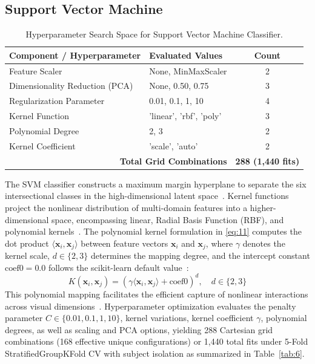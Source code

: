 \subsection{Support Vector Machine}
\label{sec:support_vector_machine_classifier}
\label{sec:support_vector_machine}

\begin{table}[htbp]
\caption{Hyperparameter Search Space for Support Vector Machine Classifier.}
\label{tab:6}
\label{tab:VI}
\label{tab:svm_params}
\centering
\footnotesize
\begin{tabular}{llc}
\toprule
Component / Hyperparameter & Evaluated Values & Count \\
\midrule
Feature Scaler & None, MinMaxScaler & 2 \\
Dimensionality Reduction (PCA) & None, 0.50, 0.75 & 3 \\
Regularization Parameter & 0.01, 0.1, 1, 10 & 4 \\
Kernel Function & 'linear', 'rbf', 'poly' & 3 \\
Polynomial Degree & 2, 3 & 2 \\
Kernel Coefficient & 'scale', 'auto' & 2 \\
\midrule
\multicolumn{2}{r}{\textbf{Total Grid Combinations}} & \textbf{288 (1,440 fits)} \\
\bottomrule
\end{tabular}
\end{table}

The SVM classifier constructs a maximum margin hyperplane to separate the six intersectional classes in the high-dimensional latent space~\cite{ref40}. Kernel functions project the nonlinear distribution of multi-domain features into a higher-dimensional space, encompassing linear, Radial Basis Function (RBF), and polynomial kernels~\cite{ref41}. The polynomial kernel formulation in \eqref{eq:11} computes the dot product $\langle \mathbf{x}_i, \mathbf{x}_j \rangle$ between feature vectors $\mathbf{x}_i$ and $\mathbf{x}_j$, where $\gamma$ denotes the kernel scale, $d \in \{2, 3\}$ determines the mapping degree, and the intercept constant $\text{coef0} = 0.0$ follows the scikit-learn default value~\cite{ref42}:
\begin{equation}
K(\mathbf{x}_i, \mathbf{x}_j) = (\gamma \langle \mathbf{x}_i, \mathbf{x}_j \rangle + \text{coef0})^d, \quad d \in \{2, 3\}
\label{eq:11}
\end{equation}
This polynomial mapping facilitates the efficient capture of nonlinear interactions across visual dimensions~\cite{ref43}. Hyperparameter optimization evaluates the penalty parameter $C \in \{0.01, 0.1, 1, 10\}$, kernel variations, kernel coefficient $\gamma$, polynomial degrees, as well as scaling and PCA options, yielding 288 Cartesian grid combinations (168 effective unique configurations) or 1,440 total fits under 5-Fold StratifiedGroupKFold CV with subject isolation as summarized in Table~\ref{tab:6}.
